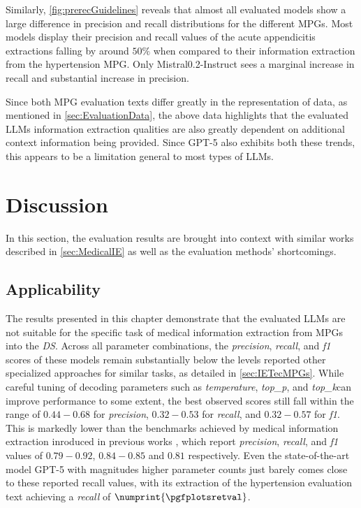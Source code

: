 \documentclass[bs, english]{stthesis}
\newcommand{\temperature}{{\textit{temperature}}}
\newcommand{\topP}{{\textit{top\_p}}}
\newcommand{\topK}{{\textit{top\_k}}}
\edef\HGPTRec{\pgfplotsretval}
\begin{document}
Similarly, \cref{fig:prerecGuidelines} reveals that almost all evaluated models show a large difference in precision and recall distributions for the different MPGs. Most models display their precision and recall values of the acute appendicitis extractions falling by around $50\%$ when compared to their information extraction from the hypertension MPG. Only Mistral0.2-Instruct sees a marginal increase in recall and substantial increase in precision.

Since both MPG evaluation texts differ greatly in the representation of data, as mentioned in \cref{sec:EvaluationData}, the above data highlights that the evaluated LLMs information extraction qualities are also greatly dependent on additional context information being provided. Since GPT-5 also exhibits both these trends, this appears to be a limitation general to most types of LLMs.

\section{Discussion}

In this section, the evaluation results are brought into context with similar works described in \cref{sec:MedicalIE} as well as the evaluation methods' shortcomings.

\subsection{Applicability}

The results presented in this chapter demonstrate that the evaluated LLMs are not suitable for the specific task of medical information extraction from MPGs into the \textit{DS}. Across all parameter combinations, the \textit{precision}, \textit{recall}, and \textit{f1} scores of these models remain substantially below the levels reported other specialized approaches for similar tasks, as detailed in \cref{sec:IETecMPGs}. While careful tuning of decoding parameters such as \temperature, \topP, and \topK can improve performance to some extent, the best observed scores still fall within the range of $0.44-0.68$ for \textit{precision}, $0.32-0.53$ for \textit{recall}, and $0.32-0.57$ for \textit{f1}. This is markedly lower than the benchmarks achieved by medical information extraction inroduced in previous works \cite{kaiserGainingProcessInformation2005,loglisciKnowledgeBasedFrameworkInformation2009,hussainTextClassificationClinical2021,fazlicNovelNLPFUZZYSystem2019}, which report \textit{precision}, \textit{recall}, and \textit{f1} values of $0.79-0.92$, $0.84-0.85$ and $0.81$ respectively. 
Even the state-of-the-art model GPT-5 with magnitudes higher parameter counts just barely comes close to these reported recall values, with its extraction of the hypertension evaluation text achieving a \textit{recall} of $\numprint{\HGPTRec}$\npnoround. 
\end{document}
